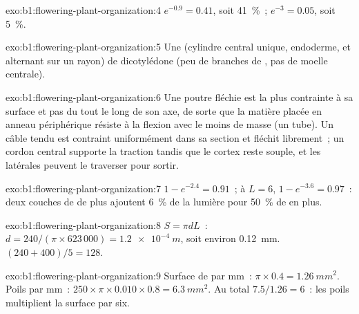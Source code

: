 \begin{solution}{exo:b1:flowering-plant-organization:4}
$e^{-0.9} = 0.41$, soit \qty{41}{\%}~; $e^{-3} = 0.05$, soit
\qty{5}{\%}.
\end{solution}

\begin{solution}{exo:b1:flowering-plant-organization:5}
Une  (cylindre central unique, endoderme,  et 
alternant sur un rayon) de dicotylédone (peu de branches de , pas
de moelle centrale).
\end{solution}

\begin{solution}{exo:b1:flowering-plant-organization:6}
Une poutre fléchie est la plus contrainte à sa surface et pas du tout le
long de son axe, de sorte que la matière placée en anneau périphérique
résiste à la flexion avec le moins de masse (un tube). Un câble tendu
est contraint uniformément dans sa section et fléchit librement~; un
cordon central supporte la traction tandis que le cortex reste souple,
et les  latérales peuvent le traverser pour sortir.
\end{solution}

\begin{solution}{exo:b1:flowering-plant-organization:7}
$1 - e^{-2.4} = 0.91$~; à $L = 6$, $1 - e^{-3.6} = 0.97$~: deux couches
de  de plus ajoutent \qty{6}{\%} de la lumière pour \qty{50}{\%}
de  en plus.
\end{solution}

\begin{solution}{exo:b1:flowering-plant-organization:8}
$S = \pi d L$~: $d = 240/(\pi\times 623\,000) = \qty{1.2e-4}{m}$, soit
environ \qty{0.12}{mm}. $(240 + 400)/5 = 128$.
\end{solution}

\begin{solution}{exo:b1:flowering-plant-organization:9}
Surface de  par mm~: $\pi\times 0.4 = \qty{1.26}{mm^2}$. Poils par
mm~: $250\times\pi\times 0.010\times 0.8 = \qty{6.3}{mm^2}$. Au total
$7.5/1.26 = 6$~: les poils multiplient la surface par six.
\end{solution}

